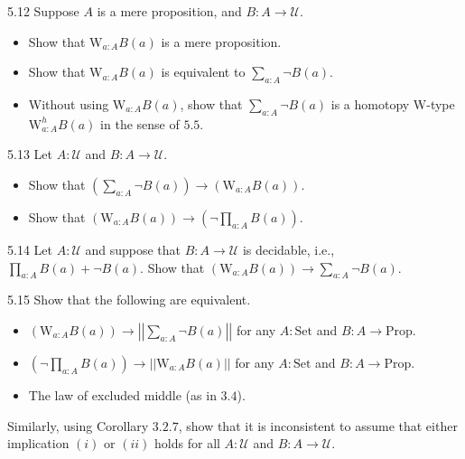 \documentclass[14pt]{extarticle}
\newcommand{\0}{{\mathbf 0}}
\newcommand{\1}{{\mathbf 1}}
\newcommand{\2}{{\mathbf 2}}
\newcommand{\UU}{{\mathcal U}}
\newcommand{\Prop}{\mathrm{Prop}}
\newcommand{\W}{\mathrm{W}}
\newcommand{\Set}{\mathrm{Set}}
\begin{document}
\begin{prob}{5.12}{} Suppose $A$ is a mere proposition, and $B : A \to \UU$.
\begin{itemize}
\item [(i)] Show that $\W_{a:A}B(a)$ is a mere proposition.
\item [(ii)] Show that $\W_{a:A}B(a)$ is equivalent to $\sum_{a:A}\neg B(a)$.
\item [(iii)] Without using $\W_{a:A}B(a)$, show that $\sum_{a:A}\neg B(a)$ is a homotopy W-type $\W^h_{a:A}B(a)$ in the sense of $5.5$.
\end{itemize}
\end{prob}

\begin{prob}{5.13}{} Let $A : \UU$ and $B : A \to \UU$.
\begin{itemize}
\item [(i)] Show that $\left( \sum_{a:A} \neg B(a)\right) \to \left( \W_{a:A}B(a) \right)$.
\item [(ii)] Show that $\left( \W_{a:A}B(a) \right) \to \left( \neg\prod_{a:A}B(a)\right)$.
\end{itemize}

\end{prob}

\begin{prob}{5.14}{}
Let $A : \UU$ and suppose that $B : A \to \UU$ is decidable, i.e., $\prod_{a:A}B(a) + \neg B(a)$. Show that $\left(\W_{a:A}B(a)\right) \to \sum_{a:A}\neg B(a)$.
\end{prob}

\begin{prob}{5.15}{}
Show that the following are equivalent.
\begin{itemize} 
\item [(i)] $\left(\W_{a:A}B(a)\right) \to \left| \left| \sum_{a:A} \neg B(a) \right| \right|$ for any $A : \Set$ and $B : A \to \Prop$.
\item [(ii)] $\left(\neg \prod_{a:A}B(a)\right) \to \left| \left| \W_{a:A} B(a) \right| \right|$ for any $A : \Set$ and $B : A \to \Prop$.
\item [(iii)] The law of excluded middle (as in $3.4$).
\end{itemize}
Similarly, using Corollary $3.2.7$, show that it is inconsistent to assume that either implication $(i)$ or $(ii)$ holds for all $A:\UU$ and $B : A \to \UU$.
\end{prob}
\end{document}
